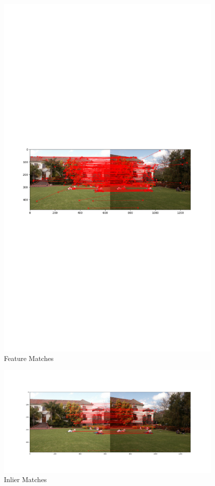\documentclass{article}
\begin{document}
\begin{figure}[H]
    \centering
    \includegraphics[trim={2cm 17cm 2cm 17cm},clip,width=\textwidth]{q4/output/output_1.png}
    \caption{Feature Matches}
\end{figure}
\begin{figure}[H]
    \centering
    \includegraphics[trim={3cm 3cm 3cm 3cm},clip,width=\textwidth]{q4/output/output_2.png}
    \caption{Inlier Matches}
\end{figure}
\end{document}
